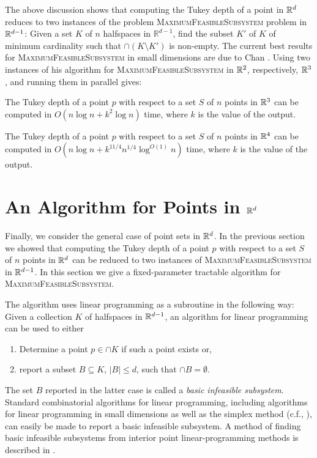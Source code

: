 \documentclass[charterfonts,lotsofwhite]{patmorin}
\begin{document}
The above discussion shows that computing the Tukey depth of a point
in $\mathbb{R}^d$ reduces to two instances of the problem
\textsc{MaximumFeasibleSubsystem} problem in $\mathbb{R}^{d-1}$: Given a set
$K$ of $n$ halfspaces in $\mathbb{R}^{d-1}$, find the subset $K'$ of
$K$ of minimum cardinality such that $\cap (K\setminus K')$ is
non-empty.  The current best results for
\textsc{MaximumFeasibleSubsystem} in small dimensions are due to Chan
\cite{c05}.  Using two instances of his algorithm for
\textsc{MaximumFeasibleSubsystem} in $\mathbb{R}^2$, respectively, $\mathbb{R}^3$, and
running them in parallel gives:

\begin{thm}
The Tukey depth of a point $p$ with respect to a set $S$ of $n$ points
in $\mathbb{R}^3$ can be computed in $O(n\log n + k^2\log n)$ time, where
$k$ is the value of the output.
\end{thm}


\begin{thm}
The Tukey depth of a point $p$ with respect to a set $S$ of $n$ points
in $\mathbb{R}^4$ can be computed in $O(n\log n + k^{11/4}n^{1/4}\log^{O(1)}
n)$ time, where $k$ is the value of the output.
\end{thm}

\section{An Algorithm for Points in $\mathbb{R}^d$}

Finally, we consider the general case of point sets in $\mathbb{R}^d$.  In the
previous section we showed that computing the Tukey depth of a point
$p$ with respect to a set $S$ of $n$ points in $\mathbb{R}^d$ can be reduced
to two instances of \textsc{MaximumFeasibleSubsystem} in $\mathbb{R}^{d-1}$.
In this section we give a fixed-parameter tractable \cite{df98}
algorithm for \textsc{MaximumFeasibleSubsystem}.  

The algorithm uses linear programming as a subroutine in the following
way:  Given a collection $K$ of halfspaces in $\mathbb{R}^{d-1}$, an algorithm
for linear programming can be used to either
\begin{enumerate}
\item Determine a point $p\in\cap K$ if such a point exists or,
\item report a subset $B\subseteq K$, $|B|\le d$, such that 
	$\cap B=\emptyset$.
\end{enumerate}
The set $B$ reported in the latter case is called a \emph{basic
infeasible subsystem}.  Standard combinatorial algorithms for linear
programming, including algorithms for linear programming in small
dimensions \cite{c95,d84,m83,m84,s91,sw92} as well as the simplex
method (c.f., \cite{chvatal80}), can easily be made to report a basic
infeasible subsystem.  A method of finding basic infeasible subsystems
from interior point linear-programming methods is described in
.
\end{document}
